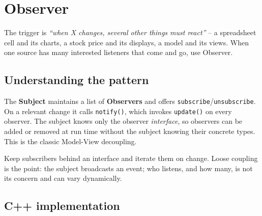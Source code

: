 \section{Observer}
\label{sec:pat-observer}


\begin{patternbox}
The trigger is \emph{``when X changes, several other things must react''} --
a spreadsheet cell and its charts, a stock price and its displays, a model
and its views. When one source has many interested listeners that come and
go, use Observer.
\end{patternbox}

\subsection*{Understanding the pattern}

The \textbf{Subject} maintains a list of \textbf{Observers} and offers
\texttt{subscribe}/\texttt{unsubscribe}. On a relevant change it calls
\texttt{notify()}, which invokes \texttt{update()} on every observer. The
subject knows only the observer \emph{interface}, so observers can be added
or removed at run time without the subject knowing their concrete types.
This is the classic Model-View decoupling.

\begin{ideabox}
Keep subscribers behind an interface and iterate them on change. Loose
coupling is the point: the subject broadcasts an event; who listens, and
how many, is not its concern and can vary dynamically.
\end{ideabox}

\subsection*{C++ implementation}


